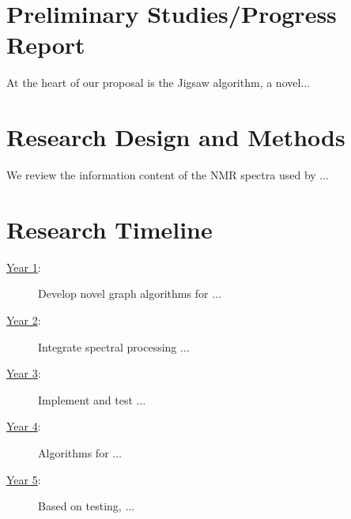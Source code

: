 \documentclass[12pt]{article}%
\def\Jigsaw{{\sc Jigsaw}}
\begin{document}
\section{Preliminary Studies/Progress Report}\label{sec:prelim}

At the heart of our proposal is the {\Jigsaw} algorithm, a novel$\ldots$

\section{Research Design and Methods}\label{sec:design}  

We review the information content of the NMR spectra used by $\ldots$



\section{Research Timeline}
\vspace*{-.1in}
{\small
\begin{center}
\begin{boxedminipage}{3.2in}

\begin{description}

\item[\underline{Year 1}:] Develop novel graph algorithms for $\ldots$

\item[\underline{Year 2}:] Integrate spectral processing $\ldots$

\item[\underline{Year 3}:] Implement and test $\ldots$

\end{description}

\end{boxedminipage}
\hspace*{0.3in}
\begin{boxedminipage}{3.2in}

\begin{description}

\item[\underline{Year 4}:] Algorithms for $\ldots$

\item[\underline{Year 5}:] Based on testing, $\ldots$

\end{description}

\end{boxedminipage}

\end{center}}
\end{document}
